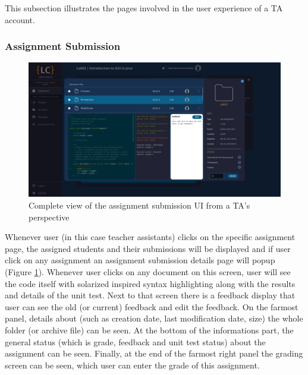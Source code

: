 \documentclass[a4paper, 12pt]{article}
\begin{document}
    This subsection illustrates the pages involved in the user experience of a TA account.
    
    \subsubsection{Assignment Submission}
    
    \begin{figure}[H]
        \centering
        \includegraphics[width=\textwidth]{ta_assignment_submission}
        \caption{Complete view of the assignment submission UI from a TA's perspective}
        \label{fig:ta_assignment_submission_full}
    \end{figure}
    
    Whenever user (in this case teacher assistants) clicks on the specific assignment page, the assigned students and their submissions will be displayed and if user click on any assignment
    an assignment submission details page will popup (Figure \ref{fig:ta_assignment_submission_full}). Whenever user clicks on any document on this screen, user will see the code itself with 
    solarized inspired syntax highlighting along with the results and details of the unit test. Next to that screen there is a feedback display that user can see the old 
    (or current) feedback and edit the feedback. On the farmost panel, details about (such as creation date, last modification date, size) the whole folder 
    (or archive file) can be seen. At the bottom of the informations part, the general status (which is grade, feedback and unit test status) about the assignment can be seen. 
    Finally, at the end of the farmost right panel the grading screen can be seen, which user can enter the grade of this assignment. 
    
    
    
    \pagebreak
    
\end{document}
